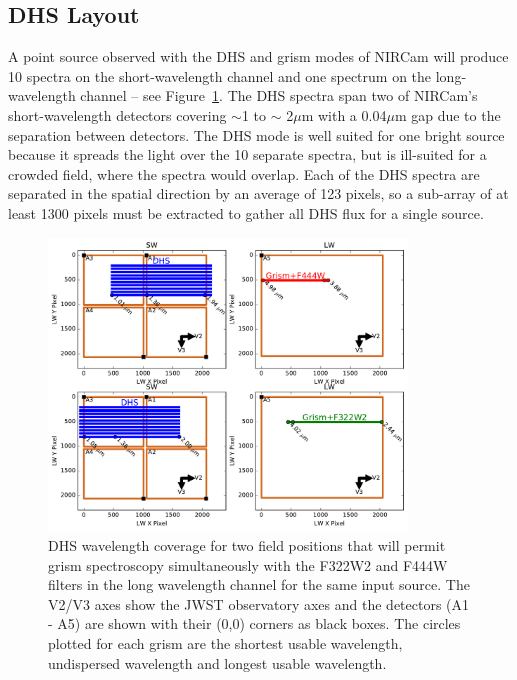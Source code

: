 \documentclass[iop]{emulateapj}
\newcommand{\DHSgap}{0.04}
\begin{document}
\subsection{DHS Layout}\label{sec:layout}

A point source observed with the DHS and grism modes of NIRCam will produce 10 spectra on the short-wavelength channel and one spectrum on the long-wavelength channel -- see Figure~\ref{fig:DHSwaveWGrism}.
The DHS spectra span two of NIRCam's short-wavelength detectors covering $\sim$1 to $\sim$ 2$\mu$m with a \DHSgap$\mu$m gap due to the separation between detectors.
The DHS mode is well suited for one bright source because it spreads the light over the 10 separate spectra, but is ill-suited for a crowded field, where the spectra would overlap.
Each of the DHS spectra are separated in the spatial direction by an average of 123 pixels, so a sub-array of at least 1300 pixels must be extracted to gather all DHS flux for a single source.

\begin{figure}[!t]
\centering
\includegraphics[width=0.85\textwidth]{grism_pos_for_max_wcoverage.pdf}
\caption{DHS wavelength coverage for two field positions that will permit grism spectroscopy simultaneously with the F322W2 and F444W filters in the long wavelength channel for the same input source. The V2/V3 axes show the JWST observatory axes and the detectors (A1 - A5) are shown with their (0,0) corners as black boxes. The circles plotted for each grism are the shortest usable wavelength, undispersed wavelength and longest usable wavelength.}\label{fig:DHSwaveWGrism}
\end{figure}
\end{document}
